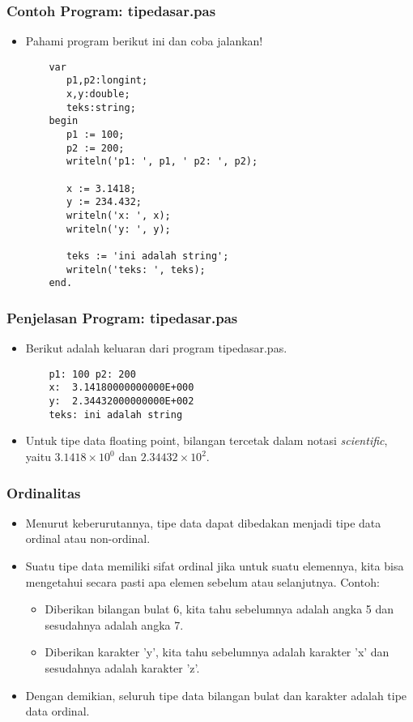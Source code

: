 \documentclass{beamer}
\begin{document}
\begin{frame}[fragile]
\frametitle{Contoh Program: tipedasar.pas}
\begin{itemize}
	\item Pahami program berikut ini dan coba jalankan!
	\begin{lstlisting}
	var
	   p1,p2:longint;
	   x,y:double;
	   teks:string;
	begin
	   p1 := 100;
	   p2 := 200;
	   writeln('p1: ', p1, ' p2: ', p2);
	   
	   x := 3.1418;
	   y := 234.432;
	   writeln('x: ', x);
	   writeln('y: ', y);
	   
	   teks := 'ini adalah string';
	   writeln('teks: ', teks);
	end.
	\end{lstlisting}
\end{itemize}
\end{frame}

\begin{frame}[fragile]
\frametitle{Penjelasan Program: tipedasar.pas}
\begin{itemize}
	\item Berikut adalah keluaran dari program tipedasar.pas.
	\begin{lstlisting}
	p1: 100 p2: 200
	x:  3.14180000000000E+000
	y:  2.34432000000000E+002
	teks: ini adalah string
	\end{lstlisting}
	\item Untuk tipe data floating point, bilangan tercetak dalam notasi \textit{scientific}, yaitu $3.1418 \times 10^{0}$ dan $2.34432 \times 10^{2}$.
\end{itemize}
\end{frame}

\begin{frame}
\frametitle{Ordinalitas}
\begin{itemize}
	\item Menurut keberurutannya, tipe data dapat dibedakan menjadi tipe data ordinal atau non-ordinal.
	\item Suatu tipe data memiliki sifat ordinal jika untuk suatu elemennya, kita bisa mengetahui secara pasti apa elemen sebelum atau selanjutnya. Contoh:
	\begin{itemize}
		\item Diberikan bilangan bulat 6, kita tahu sebelumnya adalah angka 5 dan sesudahnya adalah angka 7.
		\item Diberikan karakter 'y', kita tahu sebelumnya adalah karakter 'x' dan sesudahnya adalah karakter 'z'.
	\end{itemize}
	\item Dengan demikian, seluruh tipe data bilangan bulat dan karakter adalah tipe data ordinal.
\end{itemize}
\end{frame}
\end{document}
